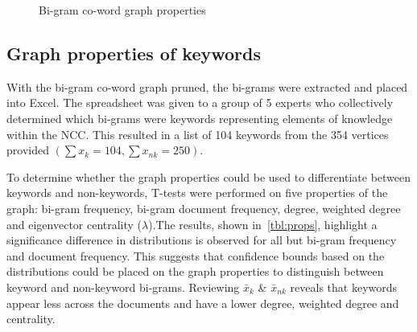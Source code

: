 \documentclass[a4paper, 11pt]{article}
\begin{document}
\begin{figure}[t!]
  \centering
   \hfill
  \caption{Bi-gram co-word graph properties}\label{fig:co-word-props}
\end{figure}

\subsection{Graph properties of keywords}

With the bi-gram co-word graph pruned, the bi-grams were extracted and placed into Excel. The spreadsheet was given to a group of 5 experts who collectively determined which bi-grams were keywords representing elements of knowledge within the NCC. This resulted in a list of 104 keywords from the 354 vertices provided $\left(\sum x_k=104,\sum x_{nk}=250\right)$. 

To determine whether the graph properties could be used to differentiate between keywords and non-keywords, T-tests were performed on five properties of the graph: bi-gram frequency, bi-gram document frequency, degree, weighted degree and eigenvector centrality ($\lambda$).The results, shown in~\cref{tbl:props}, highlight a significance difference in distributions is observed for all but bi-gram frequency and document frequency. This suggests that confidence bounds based on the distributions could be placed on the graph properties to distinguish between keyword and non-keyword bi-grams. Reviewing $\bar{x}_k$ \& $\bar{x}_{nk}$ reveals that keywords appear less across the documents and have a lower degree, weighted degree and centrality.
\end{document}
